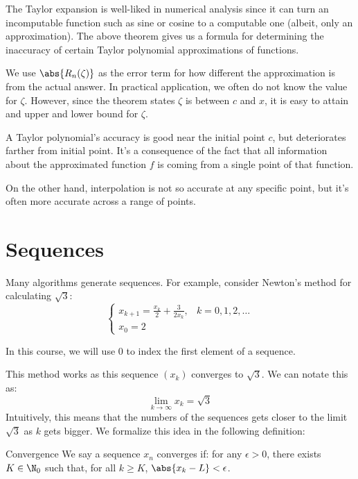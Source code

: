 The Taylor expansion is well-liked in numerical analysis since it can turn an incomputable function such as sine or cosine to a computable one (albeit, only an approximation). The above theorem gives us a formula for determining the inaccuracy of certain Taylor polynomial approximations of functions.

We use $\abs{R_n(\zeta)}$ as the error term for how different the approximation is from the actual answer. In practical application, we often do not know the value for $\zeta$. However, since the theorem states $\zeta$ is between $c$ and $x$, it is easy to attain and upper and lower bound for $\zeta$.


A Taylor polynomial's accuracy is good near the initial point $c$, but deteriorates farther from initial point. It's a consequence of the fact that all information about the approximated function $f$ is coming from a single point of that function.

On the other hand, interpolation is not so accurate at any specific point, but it's often more accurate across a range of points.

\section{Sequences}

Many algorithms generate sequences. For example, consider Newton's method for calculating $\sqrt{3}$:
\[ \begin{cases}
    x_{k+1} = \frac{x_k}{2} + \frac{3}{2x_k}, & k = 0,1,2,\ldots \\ 
    x_0 = 2
\end{cases}\]

\begin{notebox}
    In this course, we will use $0$ to index the first element of a sequence.
\end{notebox}

This method works as this sequence $(x_k)$ converges to $\sqrt{3}$. We can notate this as:
\[ \lim_{k \to \infty} x_k = \sqrt{3} \]
Intuitively, this means that the numbers of the sequences gets closer to the limit $\sqrt{3}$ as $k$ gets bigger. We formalize this idea in the following definition:

\begin{dfnbox}{Convergence}{}
    We say a sequence $x_n$ converges if: for any $\epsilon > 0$, there exists $K \in \N_0$ such that, for all $k \geq K$, $\abs{x_k - L} < \epsilon$.
\end{dfnbox}

